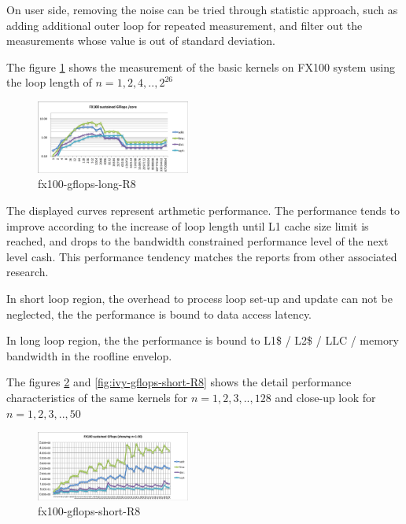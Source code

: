 \documentclass[conference]{IEEEtran}
\begin{document}
On user side, removing the noise can be tried through statistic approach,
such as
adding additional outer loop for repeated measurement, and filter out
the measurements whose value is out of standard deviation.


The figure \ref{fig:fx100-gflops-long-R8} shows the 
measurement of the basic kernels on FX100 system using the loop length of
\begin{math}
n=1,2,4,..,2^{26}
\end{math}

\begin{figure}[bt]
\centering
\includegraphics[width=0.45\textwidth]{figs/fx100-gflops-long-R8.pdf}
\caption{fx100-gflops-long-R8}
\label{fig:fx100-gflops-long-R8}
\end{figure}

The displayed curves represent arthmetic performance.
The performance tends to improve according to the increase of
loop length until L1 cache size limit is reached, and drops to
the bandwidth constrained performance level of the next level cash.
This performance tendency matches the reports from other associated research.

In short loop region,
the overhead to process loop set-up and update can not be neglected,
the the performance is bound to data access latency.

In long loop region,
the the performance is bound to
L1\$ / L2\$ / LLC / memory bandwidth in the roofline envelop.

\cite{Williams:2009:RIV:1498765.1498785} 

The figures
\ref{fig:fx100-gflops-short-R8} and \ref{fig:ivy-gflops-short-R8}
shows the detail performance characteristics of the same kernels
for
\begin{math}
n=1,2,3,..,128
\end{math}
and close-up look for
\begin{math}
n=1,2,3,..,50
\end{math}


\begin{figure}[bt]
\centering
\includegraphics[width=0.45\textwidth]{figs/fx100-gflops-short-R8.pdf}
\caption{fx100-gflops-short-R8}
\label{fig:fx100-gflops-short-R8}
\end{figure}
\end{document}
